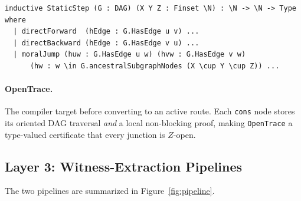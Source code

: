 \documentclass[acmsmall,screen,review,anonymous,nonacm]{acmart}
\newcommand{\lean}[1]{\lstinline!#1!}
\newcommand{\N}{\mathbb{N}}
\begin{document}
\begin{lstlisting}[caption={Static route IR (excerpt)}]
inductive StaticStep (G : DAG) (X Y Z : Finset \N) : \N -> \N -> Type where
  | directForward  (hEdge : G.HasEdge u v) ...
  | directBackward (hEdge : G.HasEdge v u) ...
  | moralJump (huw : G.HasEdge u w) (hvw : G.HasEdge v w)
      (hw : w \in G.ancestralSubgraphNodes (X \cup Y \cup Z)) ...
\end{lstlisting}

\paragraph{OpenTrace.} The compiler target before converting to an active route.
Each \lean{cons} node stores its oriented DAG traversal \emph{and} a local
non-blocking proof, making \lean{OpenTrace} a type-valued certificate that every
junction is $Z$-open.

\subsection{Layer 3: Witness-Extraction Pipelines}

The two pipelines are summarized in Figure~\ref{fig:pipeline}.
\end{document}
